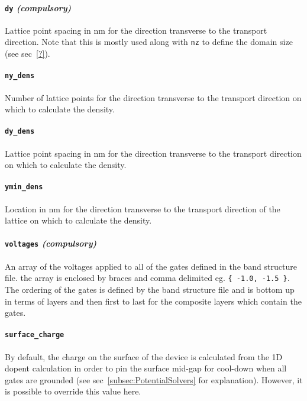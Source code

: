 \documentclass[12pt]{article}
\begin{document}
\paragraph{\texttt{dy} \emph{(compulsory)}}
Lattice point spacing in nm for the direction transverse to the transport direction.
Note that this is mostly used along with \texttt{nz} to define the domain size (see
sec~\ref{?}).

\paragraph{\texttt{ny\_dens}}
Number of lattice points for the direction transverse to the transport direction on which
to calculate the density.

\paragraph{\texttt{dy\_dens}}
Lattice point spacing in nm for the direction transverse to the transport direction on
which to calculate the density.

\paragraph{\texttt{ymin\_dens}}
Location in nm for the direction transverse to the transport direction of the lattice on
which to calculate the density.

\paragraph{\texttt{voltages} \emph{(compulsory)}}
An array of the voltages applied to all of the gates defined in the band structure file.
the array is enclosed by braces and comma delimited eg. \texttt{\{ -1.0, -1.5 \}}.  The
ordering of the gates is defined by the band structure file and is bottom up in terms of
layers and then first to last for the composite layers which contain the gates.

\paragraph{\texttt{surface\_charge}}
By default, the charge on the surface of the device is calculated from the 1D dopent
calculation in order to pin the surface mid-gap for cool-down when all gates are grounded
(see sec~\ref{subsec:PotentialSolvers} for explanation).  However, it is possible to
override this value here.
\end{document}

